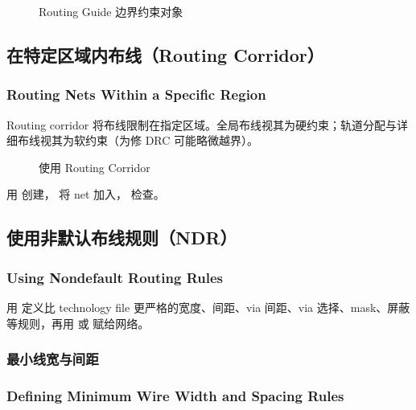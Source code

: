 \begin{figure}[htbp]
\centering
{}
\caption{Routing Guide 边界约束对象}
\label{fig:perimeter-guide}
\end{figure}

\subsection{在特定区域内布线（Routing Corridor）}
\subsubsection*{Routing Nets Within a Specific Region}

Routing corridor 将布线限制在指定区域。全局布线视其为硬约束；轨道分配与详细布线视其为软约束（为修 DRC 可能略微越界）。

\begin{figure}[htbp]
\centering
{}
\caption{使用 Routing Corridor}
\label{fig:routing-corridor}
\end{figure}

用  创建， 将 net 加入， 检查。

\subsection{使用非默认布线规则（NDR）}
\subsubsection*{Using Nondefault Routing Rules}

用  定义比 technology file 更严格的宽度、间距、via 间距、via 选择、mask、屏蔽等规则，再用  或  赋给网络。

\subsubsection{最小线宽与间距}
\subsubsection*{Defining Minimum Wire Width and Spacing Rules}

